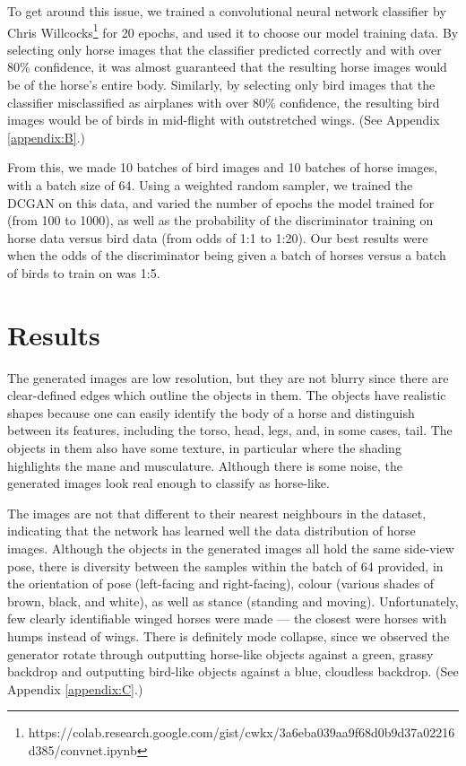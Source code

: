 \documentclass{article}
\begin{document}
To get around this issue, we trained a convolutional neural network classifier by Chris Willcocks\footnote{https://colab.research.google.com/gist/cwkx/3a6eba039aa9f68d0b9d37a02216d385/convnet.ipynb} for 20 epochs, and used it to choose our model training data. By selecting only horse images that the classifier predicted correctly and with over 80\% confidence, it was almost guaranteed that the resulting horse images would be of the horse's entire body. Similarly, by selecting only bird images that the classifier misclassified as airplanes with over 80\% confidence, the resulting bird images would be of birds in mid-flight with outstretched wings. (See Appendix \ref{appendix:B}.) 

From this, we made 10 batches of bird images and 10 batches of horse images, with a batch size of 64. Using a weighted random sampler, we trained the DCGAN on this data, and varied the number of epochs the model trained for (from 100 to 1000), as well as the probability of the discriminator training on horse data versus bird data (from odds of 1:1 to 1:20). Our best results were when the odds of the discriminator being given a batch of horses versus a batch of birds to train on was 1:5.

\section{Results}
The generated images are low resolution, but they are not blurry since there are clear-defined edges which outline the objects in them. The objects have realistic shapes because one can easily identify the body of a horse and distinguish between its features, including the torso, head, legs, and, in some cases, tail. The objects in them also have some texture, in particular where the shading highlights the mane and musculature. Although there is some noise, the generated images look real enough to classify as horse-like. 

The images are not that different to their nearest neighbours in the dataset, indicating that the network has learned well the data distribution of horse images. Although the objects in the generated images all hold the same side-view pose, there is diversity between the samples within the batch of 64 provided, in the orientation of pose (left-facing and right-facing), colour (various shades of brown, black, and white), as well as stance (standing and moving). Unfortunately, few clearly identifiable winged horses were made --- the closest were horses with humps instead of wings. There is definitely mode collapse, since we observed the generator rotate through outputting horse-like objects against a green, grassy backdrop and outputting bird-like objects against a blue, cloudless backdrop. (See Appendix \ref{appendix:C}.) 
\end{document}
